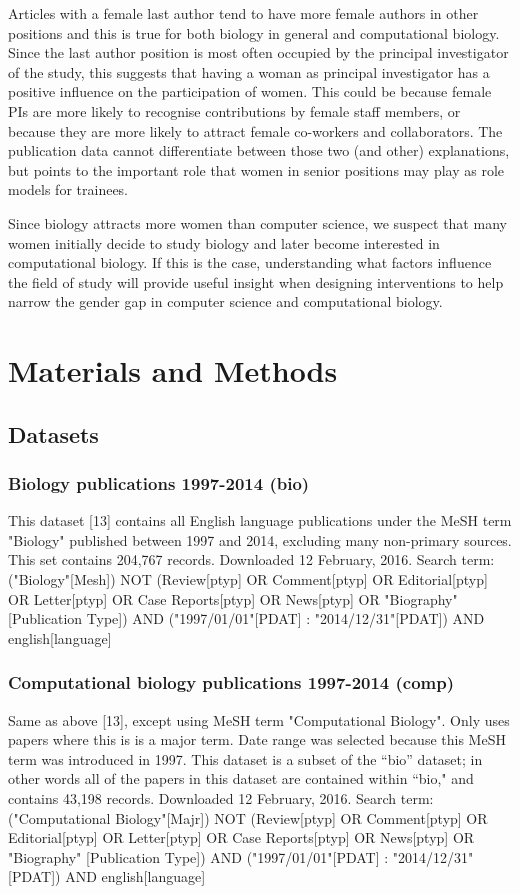 \documentclass[10pt,letterpaper]{article}
\begin{document}
\begin{flushleft}
Articles with a female last author tend to have more female authors in other positions and this is true for both biology in general and computational biology.  Since the last author position is most often occupied by the principal investigator of the study, this suggests that having a woman as principal investigator has a positive influence on the participation of women. This could be because female PIs are more likely to recognise contributions by female staff members, or because they are more likely to attract female co-workers and collaborators. The publication data cannot differentiate between those two (and other) explanations, but points to the important role that women in senior positions may play as role models for trainees.

Since biology attracts more women than computer science, we suspect that many women initially decide to study biology and later become interested in computational biology. If this is the case, understanding what factors influence the field of study will provide useful insight when designing interventions to help narrow the gender gap in computer science and computational biology.
\section*{Materials and Methods}

\subsection*{Datasets}

\subsubsection*{Biology publications 1997-2014 (bio)}
This dataset [13] contains all English language publications under the MeSH term "Biology" published between 1997 and 2014, excluding many non-primary sources. This set contains 204,767 records. Downloaded 12 February, 2016. Search term: ("Biology"[Mesh]) NOT (Review[ptyp] OR Comment[ptyp] OR Editorial[ptyp] OR Letter[ptyp] OR Case Reports[ptyp] OR News[ptyp] OR "Biography" [Publication Type]) AND ("1997/01/01"[PDAT] : "2014/12/31"[PDAT]) AND english[language]

\subsubsection*{Computational biology publications 1997-2014 (comp)}
Same as above [13], except using MeSH term "Computational Biology". Only uses papers where this is is a major term. Date range was selected because this MeSH term was introduced in 1997. This dataset is a subset of the “bio” dataset; in other words all of the papers in this dataset are contained within “bio," and contains 43,198 records. Downloaded 12 February, 2016. Search term: ("Computational Biology"[Majr]) NOT (Review[ptyp] OR Comment[ptyp] OR Editorial[ptyp] OR Letter[ptyp] OR Case Reports[ptyp] OR News[ptyp] OR "Biography" [Publication Type]) AND ("1997/01/01"[PDAT] : "2014/12/31"[PDAT]) AND english[language]


\end{flushleft}
\end{document}
